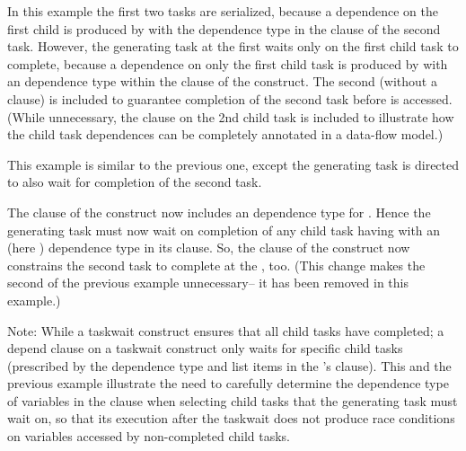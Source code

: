

In this example the first two tasks are serialized, because a dependence on
the first child is produced by  with the  dependence type
in the  clause of the second task.
However, the generating task at the first  waits only on the
first child task to complete, because a dependence on only the first child task
is produced by  with an  dependence type within the
 clause of the  construct.
The second  (without a  clause) is included
to guarantee completion of the second task before  is accessed.
(While unnecessary, the   clause on the  2nd child task is
included to illustrate how the child task dependences can be completely annotated
in a data-flow model.)



\clearpage


This example is similar to the previous one, except the generating task is
directed to also wait for completion of the second task.

The  clause of the  construct now includes an
 dependence type for .  Hence the generating task must now
wait on completion of any child task having  with an 
(here ) dependence type in its  clause.
So, the  clause of the  construct now constrains
the second task to complete at the , too.
(This change makes the second  of the previous example unnecessary--
it has been removed in this example.)

Note: While a taskwait construct ensures that all child tasks have completed; a depend clause on a taskwait
construct only waits for specific child tasks (prescribed by the dependence type and list
items in the 's  clause).
This and the previous example illustrate the need to carefully determine
the dependence type of variables in the   clause
when selecting child tasks that the generating task must wait on, so that its execution after the
taskwait does not produce race conditions on variables accessed by non-completed child tasks.

